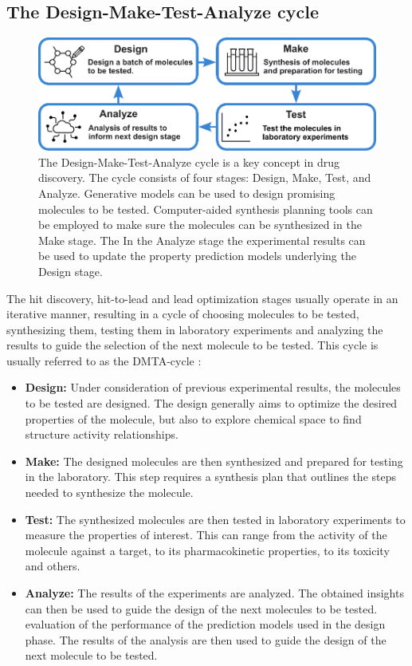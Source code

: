 \subsection{The Design-Make-Test-Analyze cycle}
\begin{figure}
      \centering
      \includegraphics[width=\textwidth]{figures/dmta_cycle_v2.pdf}
      \caption{The Design-Make-Test-Analyze cycle is a key concept in drug discovery. The cycle
            consists of four stages: Design, Make, Test, and Analyze. Generative models can be used
            to design promising molecules to be tested. Computer-aided synthesis planning tools can
            be employed to make sure the molecules can be synthesized in the Make stage. The
            In the Analyze stage the experimental results can be used to update the property prediction
            models underlying the Design stage.
            \label{fig:dmta-cycle}}
\end{figure}
The hit discovery, hit-to-lead and lead optimization stages usually operate in an iterative manner,
resulting in a cycle of choosing molecules to be tested, synthesizing them, testing them in
laboratory experiments and analyzing the results to guide the selection of the next molecule to be
tested. This cycle is usually referred to as the \ac{DMTA}-cycle \citep{wesolowskiStrategiesPoliticsSuccessful2016}:
\begin{itemize}
      \item \textbf{Design:} Under consideration of previous experimental results, the molecules to
            be tested are designed. The design generally aims to optimize the desired properties of
            the molecule, but also to explore chemical space to find structure activity relationships.
      \item \textbf{Make:} The designed molecules are then synthesized and prepared for testing in
            the laboratory. This step requires a synthesis plan that outlines the steps needed to
            synthesize the molecule.
      \item \textbf{Test:} The synthesized molecules are then tested in laboratory experiments to
            measure the properties of interest. This can range from the activity of the molecule
            against a target, to its pharmacokinetic properties, to its toxicity and others.
      \item \textbf{Analyze:} The results of the experiments are analyzed. The obtained insights
            can then be used to guide the design of the next molecules to be tested.
            evaluation of the performance of the prediction models used in the design phase. The
            results of the analysis are then used to guide the design of the next molecule to be
            tested.
\end{itemize}

